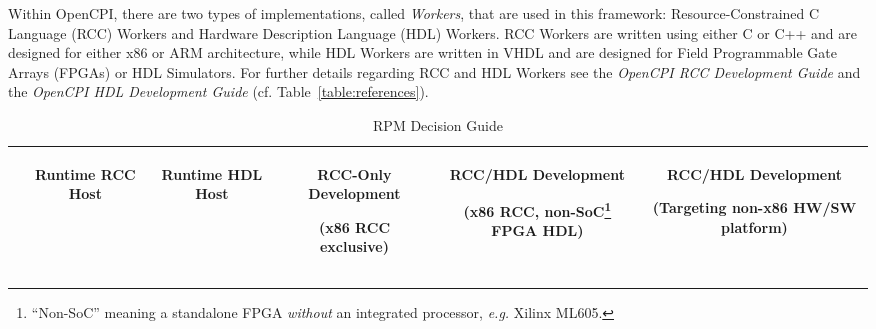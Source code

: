 Within OpenCPI, there are two types of implementations, called \textit{Workers}, that are used in this framework: Resource-Constrained C Language (RCC) Workers and Hardware Description Language (HDL) Workers. RCC Workers are written using either C or C++ and are designed for either x86 or ARM architecture, while HDL Workers are written in VHDL and are designed for Field Programmable Gate Arrays (FPGAs) or HDL Simulators. For further details regarding RCC and HDL Workers see the \textit{OpenCPI RCC Development Guide} and the \textit{OpenCPI HDL Development Guide} (cf. Table~\ref{table:references}). \\
\begin{center}
\begin{minipage}{.75\textwidth}
	\newcommand{\rpm}[6]{\multicolumn{1}{|r|}{\texttt{#1}} &
		\ifthenelse{ \equal{#2}{ } }{}{\ding{51}} &
		\ifthenelse{ \equal{#3}{ } }{}{\ding{51}} &
		\ifthenelse{ \equal{#4}{ } }{}{\ding{51}} &
		\ifthenelse{ \equal{#5}{ } }{}{\ding{51}} &
		\ifthenelse{ \equal{#6}{ } }{}{\ding{51}}\\\hline}
	\renewcommand*\footnoterule{} %
	\renewcommand{\thempfootnote}{\arabic{mpfootnote}} %
	\begin{table}[H]
	\caption{RPM Decision Guide}
	\label{table:decide}
	\begin{tabular}{r|c|c|c|c|c|}
		\cline{2-6}
		&\begin{turn}{90}Runtime RCC Host\end{turn}
		&\begin{turn}{90}Runtime HDL Host\end{turn}
		&\begin{turn}{90}RCC-Only Development\end{turn}\newline\begin{turn}{90}(x86 RCC exclusive)\end{turn}
		&\begin{turn}{90}RCC/HDL Development\end{turn}\newline\begin{turn}{90}(x86 RCC, non-SoC\footnote{``Non-SoC'' meaning a standalone FPGA \textit{without} an integrated processor, \textit{e.g.} Xilinx ML605.} FPGA HDL)\end{turn}
		&\begin{turn}{90}RCC/HDL Development\end{turn}\newline\begin{turn}{90}(Targeting non-x86 HW/SW platform)\end{turn}\\\hline

\end{tabular}
\end{table}
\end{minipage}
\end{center}
